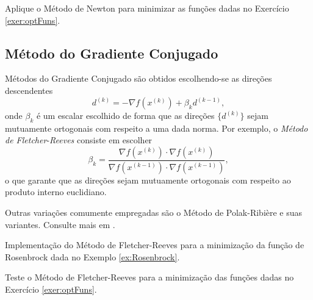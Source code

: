 \begin{exer}
  Aplique o Método de Newton para minimizar as funções dadas no Exercício \ref{exer:optFuns}.
\end{exer}

\subsection{Método do Gradiente Conjugado}
\badgeRevisar

Métodos do Gradiente Conjugado são obtidos escolhendo-se as direções descendentes
\begin{equation}
  d^{(k)} = -\nabla f(x^{(k)}) + \beta_k d^{(k-1)},
\end{equation}
onde $\beta_k$ é um escalar escolhido de forma que as direções $\{d^{(k)}\}$ sejam mutuamente ortogonais com respeito a uma dada norma. Por exemplo, o \emph{Método de Fletcher}-\emph{Reeves} consiste em escolher
\begin{equation}
  \beta_k = \frac{\nabla f(x^{(k)})\cdot\nabla f(x^{(k)})}{\nabla f(x^{(k-1)})\cdot\nabla f(x^{(k-1)})},
\end{equation}
o que garante que as direções sejam mutuamente ortogonais com respeito ao produto interno euclidiano.

\begin{obs}
  Outras variações comumente empregadas são o Método de Polak-Ribière e suas variantes. Consulte mais em \cite[Seção 5.2]{Nocedal2006}.
\end{obs}

\begin{ex}
  Implementação do Método de Fletcher-Reeves para a minimização da função de Rosenbrock dada no Exemplo \ref{ex:Rosenbrock}.
  
      
\end{ex}

\begin{exer}
  Teste o Método de Fletcher-Reeves para a minimização das funções dadas no Exercício \ref{exer:optFuns}.
\end{exer}